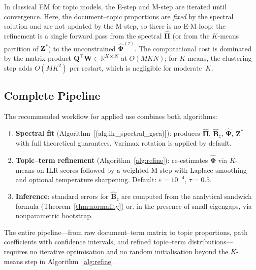 \begin{remark}
\label{rem:single_pass}
In classical EM for topic models, the E-step and M-step are iterated
until convergence. Here, the document--topic proportions are
\emph{fixed} by the spectral solution and are not updated by the
M-step, so there is no E-M loop: the refinement is a single
forward pass from the spectral $\hat{\boldsymbol{\Pi}}$
(or from the $K$-means partition of $\mathbf{Z}^*$)
to the unconstrained $\hat{\boldsymbol{\Phi}}^{(\tau)}$.
The computational cost is dominated by the matrix product
$\mathbf{Q}^{\!\top}\widetilde{\mathbf{W}}\in\mathbb{R}^{K\times N}$
at $O(MKN)$; for $K$-means, the clustering step adds $O(MK^2)$
per restart, which is negligible for moderate~$K$.
\end{remark}


\subsection{Complete Pipeline}
\label{subsec:pipeline}

The recommended workflow for applied use combines both algorithms:
%
\begin{enumerate}
  \item \textbf{Spectral fit}
    (Algorithm~\ref{(alg:ilr_spectral_gsca)}): produces
    $\hat{\boldsymbol{\Pi}}$, $\hat{\mathbf{B}}_z$,
    $\hat{\boldsymbol{\Psi}}$, $\mathbf{Z}^*$ with full theoretical
    guarantees. Varimax rotation is applied by default.

  \item \textbf{Topic--term refinement}
    (Algorithm~\ref{alg:refine}): re-estimates
    $\hat{\boldsymbol{\Phi}}$ via $K$-means on ILR scores followed by
    a weighted M-step with Laplace smoothing and optional temperature
    sharpening. Default: $\varepsilon=10^{-4}$, $\tau=0.5$.

  \item \textbf{Inference}: standard errors for
    $\hat{\mathbf{B}}_z$ are computed from the analytical sandwich
    formula (Theorem~\ref{thm:normality}) or, in the presence of
    small eigengaps, via nonparametric bootstrap.
\end{enumerate}
%
The entire pipeline---from raw document--term matrix to topic
proportions, path coefficients with confidence intervals, and
refined topic--term distributions---requires no iterative
optimisation and no random initialisation beyond the $K$-means
step in Algorithm~\ref{alg:refine}.

